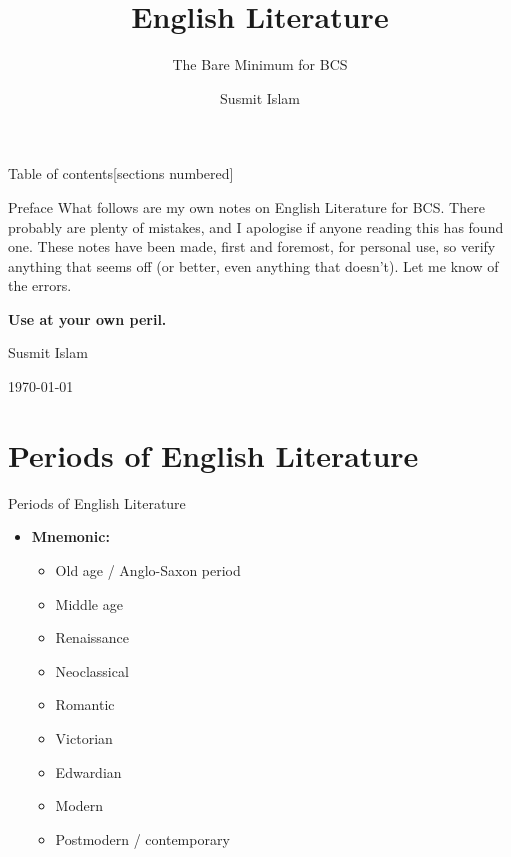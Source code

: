\documentclass[
  12pt,
  ignorenonframetext,
  progressbar=frametitle]{beamer}
\title{English Literature}
\subtitle{The Bare Minimum for BCS}
\author{Susmit Islam}
\date{}
\institute{Sir Salimullah Medical College}
\providecommand{\tightlist}{%
  \setlength{\itemsep}{0pt}\setlength{\parskip}{0pt}}
\begin{document}
\frame{\titlepage}
\begin{frame}[t,allowframebreaks]
{Table of contents}[sections numbered]

\tableofcontents[hideallsubsections]
\end{frame}


\begin{frame}[allowframebreaks]
{Preface}
\protect\hypertarget{preface}{}
What follows are my own notes on English Literature for BCS. There
probably are plenty of mistakes, and I apologise if anyone reading this
has found one. These notes have been made, first and foremost, for
personal use, so verify anything that seems off (or better, even
anything that doesn't). Let me know of the errors.

\textbf{Use at your own peril.}

\hfill Susmit Islam

\hfill \today
\end{frame}

\section{Periods of English Literature}
\begin{frame}[allowframebreaks]
{Periods of English Literature}
\protect\hypertarget{periods-of-english-literature}{}
\begin{itemize}
\tightlist
\item
  \textbf{Mnemonic:} 

  \begin{itemize}
  \tightlist
  \item
    Old age / Anglo-Saxon period
  \item
    Middle age
  \item
    Renaissance
  \item
    Neoclassical
  \item
    Romantic
  \item
    Victorian
  \item
    Edwardian
  \item
    Modern
  \item
    Postmodern / contemporary
  \end{itemize}
\end{itemize}
\end{frame}
\end{document}
